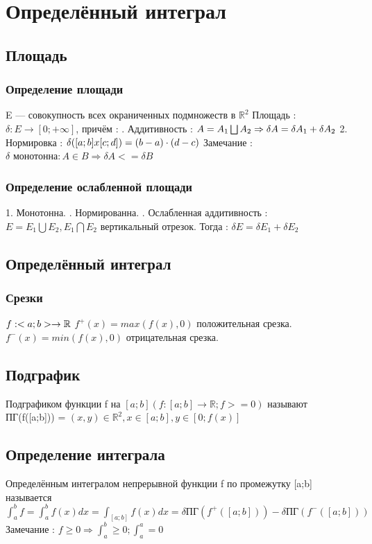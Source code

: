 \documentclass[12pt, a4paper]{article}
\newcommand{\nl}{\newline}
\begin{document}
	\section{Определённый интеграл}
	\subsection{Площадь}
	\subsubsection{Определение площади}
	E — совокупность всех окраниченных подмножеств в $\mathbb{R}^2$ \nl
	Площадь : $\delta : E \rightarrow [0; +\infty]$, причём : \nl
	1. Аддитивность : $A = A_1 \bigsqcup A_2 \Rightarrow \delta A = \delta A_1 + \delta A_2 \nl$
	2. Нормировка : $\delta([a; b] x [c; d]) = (b-a) \cdot (d-c) \nl$
	Замечание : $\delta \text{ монотонна} : A \in B \Rightarrow \delta A <= \delta B$
	
	\subsubsection{Определение ослабленной площади}
	1. Монотонна. \nl
	2. Нормированна. \nl
	3. Ослабленная аддитивность : $E = E_1 \bigcup E_2, E_1 \bigcap E_2$ вертикальный отрезок.\nl 
	Тогда : $\delta E = \delta E_1 + \delta E_2$
	
	
	\subsection{Определённый интеграл}
	\subsubsection{Срезки}
	
	$f : <a; b> \rightarrow \mathbb{R} \nl$
	$f^+(x) = max(f(x), 0)$ положительная срезка. \nl
	$f^-(x) = min(f(x), 0)$ отрицательная срезка. \nl
	
	\subsection{Подграфик}
	Подграфиком функции f на $[a; b] (f : [a;b]\rightarrow \mathbb{R}; f>=0)$ называют \nl
	ПГ(f([a;b])) = {$(x, y) \in \mathbb{R}^2, x \in [a; b], y \in [0; f(x)]$}
	
	\subsection{Определение интеграла}
	Определённым интегралом непрерывной функции f по промежутку [a;b] называется \nl
	$\int^b_a f = \int^b_a f(x) dx = \int_{[a; b]} f(x) dx = \delta \text{ПГ}(f^+([a; b])) - \delta \text{ПГ}(f^-([a; b]))$ \nl
	Замечание : $f \geq 0 \Rightarrow \int^b_a \geq 0; \int^a_a = 0$
	
\end{document}
